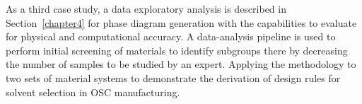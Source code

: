 As a third case study, a data exploratory analysis is described in Section~\ref{chapter4} for phase diagram generation with the capabilities to evaluate for physical and computational accuracy. 
A data-analysis pipeline is used to perform initial screening of materials to identify subgroups there by decreasing the number of samples to be studied by an expert.
Applying the methodology to two sets of material systems to demonstrate the derivation of design rules for solvent selection in OSC manufacturing.